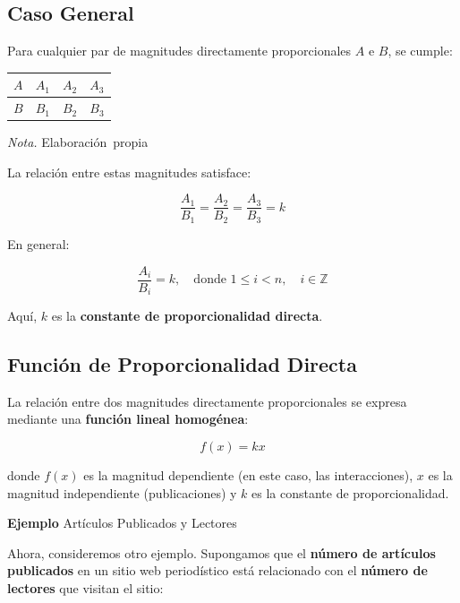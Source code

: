 \documentclass[
  stu,
  floatsintext,
  longtable,
  a4paper,
  nolmodern,
  notxfonts,
  notimes,
  12pt,
  colorlinks=true,linkcolor=blue,citecolor=blue,urlcolor=blue]{apa7}
\newcounter{none} %
\begin{document}
\subsection{Caso General}\label{caso-general}

Para cualquier par de magnitudes directamente proporcionales \(A\) e
\(B\), se cumple:

\begin{table}

{\caption{{Magnitudes directamente
proporcionales}{\label{tbl-mytable2}}}}

{\def\LTcaptype{none} %
\begin{longtable}[]{@{}llll@{}}
\toprule\noalign{}
\(A\) & \(A_1\) & \(A_2\) & \(A_3\) \\
\midrule\noalign{}
\endhead
\bottomrule\noalign{}
\endlastfoot
\(B\) & \(B_1\) & \(B_2\) & \(B_3\) \\
\end{longtable}
}

\noindent \emph{Nota.} Elaboración~propia

\end{table}

La relación entre estas magnitudes satisface:

\[
\frac{A_1}{B_1} = \frac{A_2}{B_2} = \frac{A_3}{B_3} = k
\]

En general:

\[
\frac{A_i}{B_i} = k, \quad \text{donde } 1 \leq i < n, \quad i \in \mathbb{Z}
\]

Aquí, \(k\) es la \textbf{constante de proporcionalidad directa}.

\subsection{Función de Proporcionalidad
Directa}\label{funciuxf3n-de-proporcionalidad-directa}

La relación entre dos magnitudes directamente proporcionales se expresa
mediante una \textbf{función lineal homogénea}:

\[
f(x) = kx
\]

donde \(f(x)\) es la magnitud dependiente (en este caso, las
interacciones), \(x\) es la magnitud independiente (publicaciones) y
\(k\) es la constante de proporcionalidad.

\textbf{Ejemplo} Artículos Publicados y Lectores

Ahora, consideremos otro ejemplo. Supongamos que el \textbf{número de
artículos publicados} en un sitio web periodístico está relacionado con
el \textbf{número de lectores} que visitan el sitio:
\end{document}

